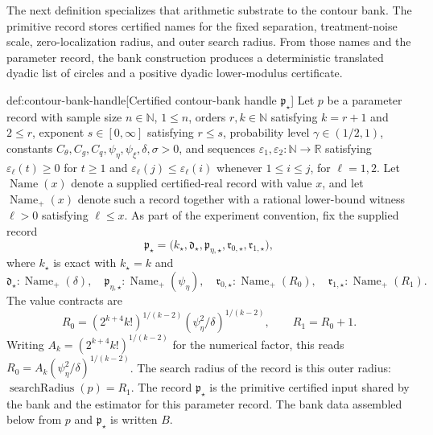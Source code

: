 \documentclass[11pt]{article}
\begin{document}
The next definition specializes that arithmetic substrate to the contour bank. The primitive record stores certified names for the fixed separation, treatment-noise scale, zero-localization radius, and outer search radius. From those names and the parameter record, the bank construction produces a deterministic translated dyadic list of circles and a positive dyadic lower-modulus certificate.

\begin{definitionv}{def:contour-bank-handle}[Certified contour-bank handle $\mathfrak p_{\star}$]
Let \(p\) be a parameter record with sample size \(n\in\mathbb N\), \(1\le n\), orders \(r,k\in\mathbb N\) satisfying \(k=r+1\) and \(2\le r\), exponent \(s\in[0,\infty]\) satisfying \(r\le s\), probability level \(\gamma\in(1/2,1)\), constants \(C_{\theta},C_g,C_q,\psi_{\eta},\psi_{\xi},\delta,\sigma>0\), and sequences \(\varepsilon_1,\varepsilon_2:\mathbb N\to\mathbb R\) satisfying \(\varepsilon_\ell(t)\ge0\) for \(t\ge1\) and \(\varepsilon_\ell(j)\le\varepsilon_\ell(i)\) whenever \(1\le i\le j\), for \(\ell=1,2\). Let \(\operatorname{Name}(x)\) denote a supplied certified-real record with value \(x\), and let \(\operatorname{Name}_{+}(x)\) denote such a record together with a rational lower-bound witness \(\ell>0\) satisfying \(\ell\le x\). As part of the experiment convention, fix the supplied record
\[
 \mathfrak p_{\star}=
 \bigl(k_{\star},\mathfrak d_{\star},\mathfrak p_{\eta,\star},
       \mathfrak r_{0,\star},\mathfrak r_{1,\star}\bigr),
\]
where \(k_{\star}\) is exact with \(k_{\star}=k\) and
\[
 \mathfrak d_{\star}:\operatorname{Name}_{+}(\delta),\quad
 \mathfrak p_{\eta,\star}:\operatorname{Name}_{+}(\psi_{\eta}),\quad
 \mathfrak r_{0,\star}:\operatorname{Name}_{+}(R_0),\quad
 \mathfrak r_{1,\star}:\operatorname{Name}_{+}(R_1).
\]
The value contracts are
\[
 R_0=(2^{k+4}k!)^{1/(k-2)}
       (\psi_{\eta}^2/\delta)^{1/(k-2)},
 \qquad R_1=R_0+1.
\]
Writing \(A_k=(2^{k+4}k!)^{1/(k-2)}\) for the numerical factor, this reads \(R_0=A_k(\psi_{\eta}^2/\delta)^{1/(k-2)}\). The search radius of the record is this outer radius: \(\operatorname{searchRadius}(p)=R_1\).
The record \(\mathfrak p_{\star}\) is the primitive certified input shared by the bank and the estimator for this parameter record.  The bank data assembled below from \(p\) and \(\mathfrak p_{\star}\) is written \(B\).


\end{definitionv}
\end{document}
